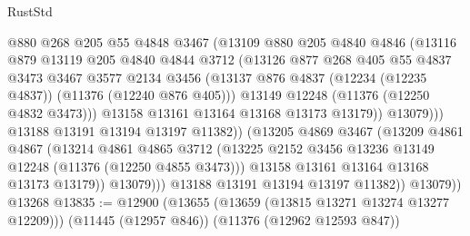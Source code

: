 \begin{lexlean}{RustStd}
\begin{coremodule}
{\begin{coremodule}
{{{{{{{{{{{{{{{{{{{{{{{{{{{{{{{{{{{{{{{{{{{{{{{{{{{{{{{{{{{{{{{{{{{{{{{{{{{{{{{{{{{{{                          @880
                          @268
                          @205
                          @55
                          @4848
                          @3467
                          (@13109
                            @880
                            @205
                            @4840
                            @4846
                            (@13116
                              @879
                              @13119
                              @205
                              @4840
                              @4844
                              @3712
                              (@13126
                                @877
                                @268
                                @405
                                @55
                                @4837
                                @3473
                                @3467
                                @3577
                                @2134
                                @3456
                                (@13137
                                  @876
                                  @4837
                                  (@12234 (@12235 @4837))
                                  (@11376 (@12240 @876 @405)))
                                @13149
                                @12248
                                (@11376 (@12250 @4832 @3473)))
                              @13158
                              @13161
                              @13164
                              @13168
                              @13173
                              @13179))
                          @13079)))
                    @13188
                    @13191
                    @13194
                    @13197
                    @11382))
                (@13205
                  @4869
                  @3467
                  (@13209
                    @4861
                    @4867
                    (@13214
                      @4861
                      @4865
                      @3712
                      (@13225 @2152 @3456 @13236 @13149 @12248 (@11376 (@12250 @4855 @3473)))
                      @13158
                      @13161
                      @13164
                      @13168
                      @13173
                      @13179))
                  @13079)))
            @13188
            @13191
            @13194
            @13197
            @11382))
        @13079))
    @13268
@13835 := @12900
    (@13655 (@13659 (@13815 @13271 @13274 @13277 @12209)))
    (@11445 (@12957 @846))
    (@11376 (@12962 @12593 @847))
}}}}}}}}}}}}}}}}}}}}}}}}}}}}}}}}}}}}}}}}}}}}}}}}}}}}}}}}}}}}}}}}}}}}}}}}}}}}}}}}}}}}}
\end{coremodule}}
\end{coremodule}
\end{lexlean}
